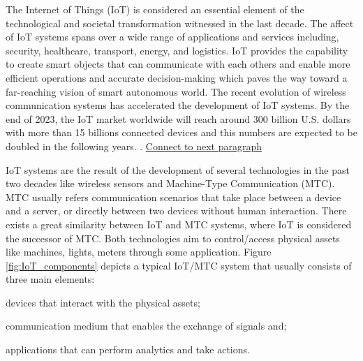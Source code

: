 \documentclass[conference]{IEEEtran}
\begin{document}








The Internet of Things (IoT) is considered an essential element of the technological and societal transformation witnessed in the last decade. The affect of IoT systems spans over a wide range of applications and services including, security, healthcare, transport, energy, and logistics. IoT provides the capability to create smart objects that can communicate with each others and enable more efficient operations and accurate decision-making which paves the way toward a far-reaching vision of smart autonomous world. The recent evolution of wireless communication systems has accelerated the development of IoT systems. By the end of 2023, the IoT market worldwide will reach around 300 billion U.S. dollars with more than 15 billions connected devices and this numbers are expected to be doubled in the following years. \cite{transforma_insights_current_nodate}.
\underline{Connect to next paragraph}


IoT systems are the result of the development of several technologies in the past two decades like wireless sensors and Machine-Type Communication (MTC). MTC usually refers communication scenarios that take place between a  device and a server, or directly between two devices without human interaction. There exists a great similarity between IoT and MTC systems, where IoT is considered the successor of MTC. Both technologies aim to control/access physical assets like machines, lights, meters through some application. Figure \ref{fig:IoT_components} \cite{herrero_fundamentals_2021} depicts a typical IoT/MTC system that usually consists of three main elements: \begin{enumerate*}
    \item   devices that interact with the physical assets;
    \item   communication medium that enables the exchange of signals and;
    \item   applications that can perform analytics and take actions.
\end{enumerate*}
\end{document}
